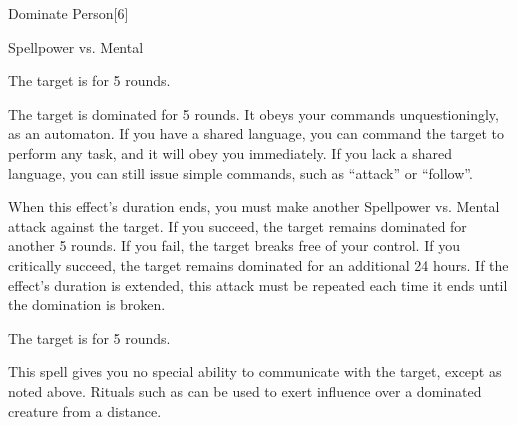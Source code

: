 \begin{spellsection}{Dominate Person}[6]
    \begin{spellheader}
    \end{spellheader}
    \begin{spellcontent}
        \begin{spelltargetinginfo}
        \end{spelltargetinginfo}
        \begin{spelleffects}
            \begin{spellattack}{Spellpower vs. Mental}

                \spellsuccess The target is \confused for 5 rounds.

                \spellcritical The target is dominated for 5 rounds. It obeys your commands unquestioningly, as an automaton. If you have a shared language, you can command the target to perform any task, and it will obey you immediately. If you lack a shared language, you can still issue simple commands, such as ``attack'' or ``follow''.

                When this effect's duration ends, you must make another Spellpower vs. Mental attack against the target. If you succeed, the target remains dominated for another 5 rounds. If you fail, the target breaks free of your control. If you critically succeed, the target remains dominated for an additional 24 hours. If the effect's duration is extended, this attack must be repeated each time it ends until the domination is broken.

                \spellfailure The target is \dazed for 5 rounds.
            \end{spellattack}
        \end{spelleffects}
    \end{spellcontent}
    \begin{spellfooter}
        \spellnotes This spell gives you no special ability to communicate with the target, except as noted above. Rituals such as  can be used to exert influence over a dominated creature from a distance.
        \miscastrandom
    \end{spellfooter}
\end{spellsection}

